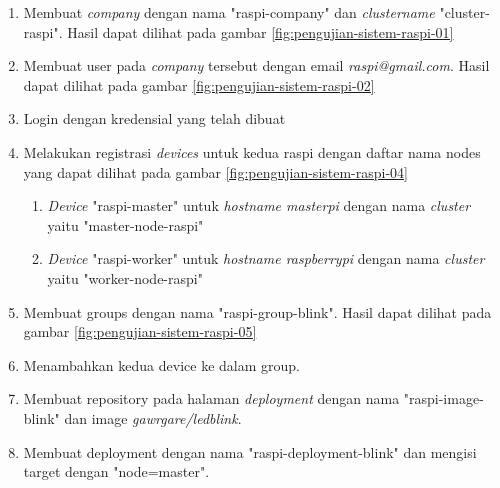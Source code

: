 \begin{enumerate}
  \item Membuat \textit{company} dengan nama "raspi-company" dan \textit{cluster\textunderscore name} "cluster-raspi". Hasil dapat dilihat pada gambar \ref{fig:pengujian-sistem-raspi-01}
  \item Membuat user pada \textit{company} tersebut dengan email \textit{raspi@gmail.com}. Hasil dapat dilihat pada gambar \ref{fig:pengujian-sistem-raspi-02}
  \item Login dengan kredensial yang telah dibuat
  \item Melakukan registrasi \textit{devices} untuk kedua raspi dengan daftar nama nodes yang dapat dilihat pada gambar \ref{fig:pengujian-sistem-raspi-04}
        \begin{enumerate}
          \item \textit{Device} "raspi-master" untuk \textit{hostname masterpi} dengan nama \textit{cluster} yaitu "master-node-raspi"
          \item  \textit{Device} "raspi-worker" untuk \textit{hostname raspberrypi} dengan nama \textit{cluster} yaitu "worker-node-raspi"
        \end{enumerate}
  \item Membuat groups dengan nama "raspi-group-blink". Hasil dapat dilihat pada gambar \ref{fig:pengujian-sistem-raspi-05}
  \item Menambahkan kedua device ke dalam group.
  \item Membuat repository pada halaman \textit{deployment} dengan nama "raspi-image-blink" dan image\textit{ gawrgare/led\textunderscore blink}.
  \item Membuat deployment dengan nama "raspi-deployment-blink" dan mengisi target dengan "node=master".
\end{enumerate}


